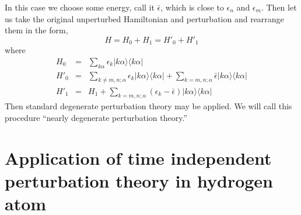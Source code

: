 In this case we choose some energy, call it $\bar{\epsilon}$, which is close to $\epsilon_n$ and $\epsilon_m$. Then let us take the original unperturbed Hamiltonian and perturbation and rearrange them in the form,
\[H = H_0 + H_1 = H'_0 + H'_1\]
where
\begin{eqnarray}
H_0 &=& \sum_{k\alpha} \epsilon_k |k\alpha\rangle\langle k\alpha| \nonumber \\
H'_0 &=& \sum_{k\neq m,n; \alpha} \epsilon_k |k\alpha\rangle\langle k\alpha| + \sum_{k= m,n; \alpha} \bar{\epsilon} |k\alpha\rangle\langle k\alpha| \nonumber \\
H'_1 &=& H_1 + \sum_{k= m,n; \alpha} (\epsilon_k - \bar{\epsilon} )|k\alpha\rangle\langle k\alpha| \nonumber
\end{eqnarray}
Then standard degenerate perturbation theory may be applied.
We will call this procedure ``nearly degenerate perturbation theory.''

\section{Application of time independent perturbation theory in hydrogen atom}

